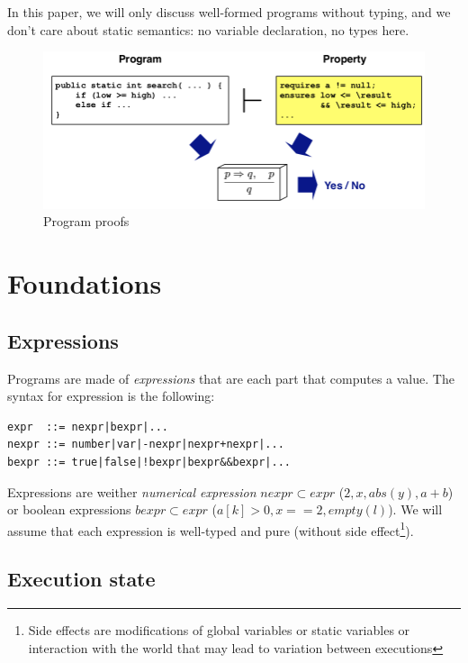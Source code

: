 \documentclass[12pt, a4paper]{book}
\begin{document}
In this paper, we will only discuss well-formed programs without typing, and we
don't care about static semantics: no variable declaration, no types here.

  \begin{figure}[!ht]
      \includegraphics[width=\linewidth]{program_proofs.png}
      \caption{Program proofs}
  \end{figure}
  \section{Foundations}
  \label{sec:Foundations}

\subsection{Expressions}
\label{sub:Expressions}


Programs are made of \textit{expressions} that are each part that computes a
value. The syntax for expression is the following:

\begin{verbatim}
expr  ::= nexpr|bexpr|...
nexpr ::= number|var|-nexpr|nexpr+nexpr|...
bexpr ::= true|false|!bexpr|bexpr&&bexpr|...
\end{verbatim}

Expressions are weither \textit{numerical expression} $nexpr \subset expr$
($2,x, abs(y), a+b$) or boolean expressions $bexpr \subset expr$
($a[k]>0, x==2, empty(l)$). We will assume that each expression is well-typed
and pure (without side effect\footnote{Side effects are modifications of global
variables or static variables or interaction with the world that may lead to
variation between executions}). \newline

\subsection{Execution state}
\label{sub:Execution state}
\end{document}
